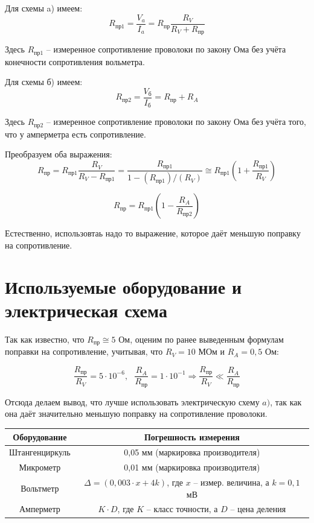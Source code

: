 \documentclass[a4paper, 12pt]{article} %
\begin{document}
Для схемы a) имеем:
\[R_{\text{пр1}} = \frac{V_a}{I_a} = R_{\text{пр}} \frac{R_V}{R_V + R_{\text{пр}}} \]

Здесь $R_{\text{пр1}}$ -- измеренное сопротивление проволоки по закону Ома без учёта конечности сопротивления вольметра.

Для схемы б) имеем:
\[R_{\text{пр2}} = \frac{V_{\text{б}}}{I_{\text{б}}} = R_{\text{пр}} + R_A\]

Здесь $R_{\text{пр2}}$ -- измеренное сопротивление проволоки по закону Ома без учёта того, что у амперметра есть сопротивление.

Преобразуем оба выражения:
\[R_{\text{пр}} = R_{\text{пр1}} \frac{R_V}{R_V - R_{\text{пр1}}} = \frac{R_{\text{пр1}}}{1 - (R_{\text{пр1}})/(R_V)} \cong R_{\text{пр1}} (1 + \frac{R_{\text{пр1}}}{R_V})\]

\[R_{\text{пр}} = R_{\text{пр1}} (1 - \frac{R_A}{R_{\text{пр2}}})\]

Естественно, использовтаь надо то выражение, которое даёт меньшую поправку на сопротивление.\\

\section{Используемые оборудование и электрическая схема}

Так как известно, что $R_{\text{пр}}\cong 5$ Ом, оценим по ранее выведенным формулам поправки на сопротивление, учитывая, что $R_V = 10$ МОм и $R_A = 0,5$ Ом:

\[\frac{R_{\text{пр}}}{R_V} = 5 \cdot 10^{-6}, \text{ } \frac{R_A}{R_{\text{пр}}} = 1 \cdot 10^{-1} \Rightarrow \frac{R_{\text{пр}}}{R_V} \ll \frac{R_A}{R_{\text{пр}}}\]

Отсюда делаем вывод, что лучше использовать электрическую схему $a)$, так как она даёт значительно меньшую поправку на сопротивление проволоки.

\begin{center}
\begin{tabular}{|c|c|}
\hline 
Оборудование & Погрешность измерения \\ 
\hline 
Штангенциркуль & 0,05 мм (маркировка производителя) \\ 
\hline 
Микрометр & 0,01 мм (маркировка производителя) \\
\hline 
Вольтметр & $\Delta = (0,003\cdot x + 4k)$, где $x$ -- измер. величина, а $k = 0,1$ мВ \\ 
\hline 
Амперметр & $K\cdot D$, где $K$ -- класс точности, а $D$ -- цена деления \\ 
\hline 
\end{tabular} 
\end{center}
\end{document}
